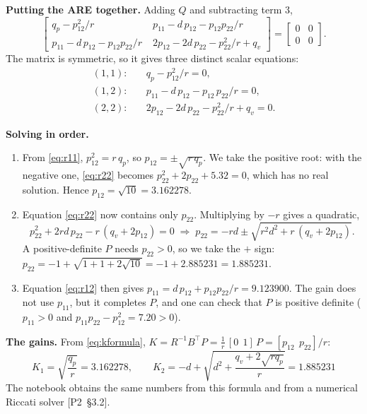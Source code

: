 \documentclass[11pt,a4paper]{article}
\newcommand{\ptwo}[1]{{\small\textsf{[P2~\S#1]}}}
\theoremstyle{definition}
\begin{document}
\textbf{Putting the ARE together.} Adding $Q$ and subtracting term 3,
\[
\begin{bmatrix}
q_p - p_{12}^2/r & \; p_{11} - d\,p_{12} - p_{12}p_{22}/r\\[2pt]
p_{11} - d\,p_{12} - p_{12}p_{22}/r & \; 2p_{12} - 2d\,p_{22} - p_{22}^2/r + q_v
\end{bmatrix}
= \begin{bmatrix} 0 & 0\\ 0 & 0\end{bmatrix}.
\]
The matrix is symmetric, so it gives three distinct scalar equations:
\begin{align}
(1,1):&\quad q_p - p_{12}^2/r = 0, \label{eq:r11}\\
(1,2):&\quad p_{11} - d\,p_{12} - p_{12}\,p_{22}/r = 0, \label{eq:r12}\\
(2,2):&\quad 2p_{12} - 2d\,p_{22} - p_{22}^2/r + q_v = 0. \label{eq:r22}
\end{align}

\textbf{Solving in order.}
\begin{enumerate}\setlength{\itemsep}{2pt}
\item From \eqref{eq:r11}, $p_{12}^2 = r\,q_p$, so
$p_{12} = \pm\sqrt{r\,q_p}$. We take the positive root: with the
negative one, \eqref{eq:r22} becomes $p_{22}^2 + 2p_{22} + 5.32 = 0$,
which has no real solution. Hence $p_{12} = \sqrt{10} = 3.162278$.
\item Equation \eqref{eq:r22} now contains only $p_{22}$. Multiplying by
$-r$ gives a quadratic,
\[
p_{22}^2 + 2rd\,p_{22} - r\,(q_v + 2p_{12}) = 0
\;\Rightarrow\;
p_{22} = -rd \pm \sqrt{r^2d^2 + r\,(q_v + 2p_{12})}.
\]
A positive-definite $P$ needs $p_{22} > 0$, so we take the $+$ sign:
$p_{22} = -1 + \sqrt{1 + 1 + 2\sqrt{10}} = -1 + 2.885231 = 1.885231$.
\item Equation \eqref{eq:r12} then gives
$p_{11} = d\,p_{12} + p_{12}p_{22}/r = 9.123900$. The gain does not use
$p_{11}$, but it completes $P$, and one can check that $P$ is positive
definite ($p_{11} > 0$ and $p_{11}p_{22} - p_{12}^2 = 7.20 > 0$).
\end{enumerate}

\textbf{The gains.} From \eqref{eq:kformula},
$K = R^{-1}B^{\!\top}P = \frac{1}{r}\,[0\;\,1]\,P = [p_{12}\;\,p_{22}]/r$:
\begin{equation}
\boxed{\;K_1 = \sqrt{\frac{q_p}{r}} = 3.162278,
\qquad
K_2 = -d + \sqrt{d^2 + \frac{q_v + 2\sqrt{r q_p}}{r}} = 1.885231\;}
\label{eq:lqr}
\end{equation}
The notebook obtains the same numbers from this formula and from a
numerical Riccati solver \ptwo{3.2}.
\end{document}
